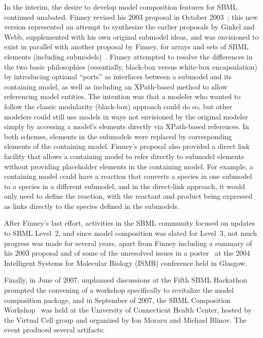 In the interim, the desire to develop model composition features for
SBML continued unabated.  Finney revised his 2003 proposal in October
2003~\cite{finney:2003b}; this new version represented an attempt to synthesize the
earlier proposals by Ginkel and Webb, supplemented with his own original
submodel ideas, and was envisioned to exist in parallel with another
proposal by Finney, for arrays and sets of SBML elements (including
submodels)~\citep{finney:2003c}.  Finney attempted to resolve the differences in the
two basic philosophies (essentially, black-box versus white-box
encapsulation) by introducing optional ``ports'' as interfaces between a
submodel and its containing model, as well as including an XPath-based
method to allow referencing model entities.  The intention was that a
modeler who wanted to follow the classic modularity (black-box) approach
could do so, but other modelers could still use models in ways not
envisioned by the original modeler simply by accessing a model's
elements directly via XPath-based references.  In both schemes, elements
in the submodels were replaced by corresponding elements of the
containing model.  Finney's proposal also provided a direct link
facility that allows a containing model to refer directly to submodel
elements without providing placeholder elements in the containing
model.  For example, a containing model could have a reaction that
converts a species in one submodel to a species in a different submodel,
and in the direct-link approach, it would only need to define the
reaction, with the reactant and product being expressed as links
directly to the species defined in the submodels.

After Finney's last effort, activities in the SBML community focused on
updates to SBML Level~2, and since model composition was slated for
Level~3, not much progress was made for several years, apart from Finney
including a summary of his 2003 proposal and of some of the unresolved
issues in a poster~\citep{finney:2004} at the 2004 Intelligent Systems for Molecular
Biology (ISMB) conference held in Glasgow.

Finally, in June of 2007, unplanned discussions at the Fifth SBML
Hackathon~\citep{sbml5} prompted the convening of a workshop
specifically to revitalize the model composition package, and in
September of 2007, the SBML Composition Workshop~\citep{comp2007} was
held at the University of Connecticut Health Center, hosted by the
Virtual Cell group and organized by Ion Moraru and Michael Blinov.  The
event produced several artifacts:

